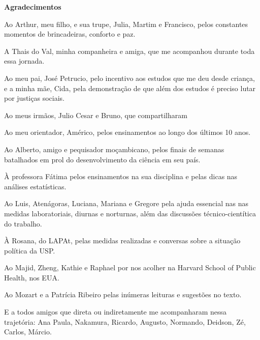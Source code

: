 \newpage

\begin{center}
  \textbf{Agradecimentos} 
\end{center}

Ao Arthur, meu filho, e sua trupe, Julia, Martim e Francisco, pelos 
constantes momentos de brincadeiras, conforto e paz.

A Thais do Val, minha companheira e amiga, que me acompanhou durante toda 
essa jornada.

Ao meu pai, José Petrucio, pelo incentivo aos estudos que me deu desde criança,
e a minha mãe, Cida, pela demonstração de que além dos estudos é preciso lutar 
por justiças sociais. 

Ao meus irmãos, Julio Cesar e Bruno, que compartilharam 

Ao meu orientador, Américo, pelos ensinamentos ao longo dos últimos 10 anos. 

Ao Alberto, amigo e pequisador moçambicano, pelos finais de semanas batalhados 
em prol do desenvolvimento da ciência em seu país. 

À professora Fátima pelos ensinamentos na sua disciplina e pelas dicas nas 
análises estatísticas. 

Ao Luis, Atenágoras, Luciana, Mariana e Gregore pela ajuda essencial nas 
nas medidas laboratoriais, diurnas e norturnas, além das discussões 
técnico-cientítica do trabalho. 

À Rosana, do LAPAt, pelas medidas realizadas e conversas sobre a situação 
política da USP.  

Ao Majid, Zheng, Kathie e Raphael por nos acolher na Harvard School of Public 
Health, nos EUA.

Ao Mozart e a Patrícia Ribeiro pelas inúmeras leituras e sugestões no texto. 

E a todos amigos que direta ou indiretamente me acompanharam nessa trajetória: 
Ana Paula, Nakamura, Ricardo, Augusto, Normando, Deidson, Zé, 
Carlos, Márcio. 



